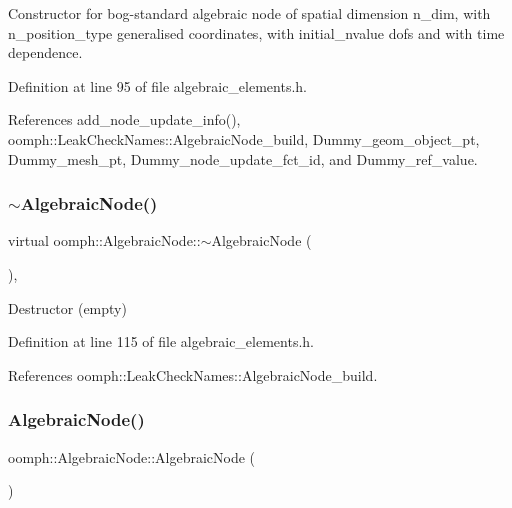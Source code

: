 Constructor for bog-\/standard algebraic node of spatial dimension n\+\_\+dim, with n\+\_\+position\+\_\+type generalised coordinates, with initial\+\_\+nvalue dofs and with time dependence. 



Definition at line 95 of file algebraic\+\_\+elements.\+h.



References add\+\_\+node\+\_\+update\+\_\+info(), oomph\+::\+Leak\+Check\+Names\+::\+Algebraic\+Node\+\_\+build, Dummy\+\_\+geom\+\_\+object\+\_\+pt, Dummy\+\_\+mesh\+\_\+pt, Dummy\+\_\+node\+\_\+update\+\_\+fct\+\_\+id, and Dummy\+\_\+ref\+\_\+value.

\mbox{\label{classoomph_1_1AlgebraicNode_af1fef20e4dd950f70003c3db5d289044}} 
\subsubsection{\texorpdfstring{$\sim$\+Algebraic\+Node()}{~AlgebraicNode()}}
{\footnotesize\ttfamily virtual oomph\+::\+Algebraic\+Node\+::$\sim$\+Algebraic\+Node (\begin{DoxyParamCaption}{ }\end{DoxyParamCaption})\hspace{0.3cm}{\ttfamily [inline]}, {\ttfamily [virtual]}}



Destructor (empty) 



Definition at line 115 of file algebraic\+\_\+elements.\+h.



References oomph\+::\+Leak\+Check\+Names\+::\+Algebraic\+Node\+\_\+build.

\mbox{\label{classoomph_1_1AlgebraicNode_a2dc795a77c106b7dd6bd3ab2c8034956}} 
\subsubsection{\texorpdfstring{Algebraic\+Node()}{AlgebraicNode()}\hspace{0.1cm}{\footnotesize\ttfamily [4/4]}}
{\footnotesize\ttfamily oomph\+::\+Algebraic\+Node\+::\+Algebraic\+Node (\begin{DoxyParamCaption}\item[{const \hyperlink{classoomph_1_1AlgebraicNode}{Algebraic\+Node} \&}]{ }\end{DoxyParamCaption})\hspace{0.3cm}{\ttfamily [inline]}}



